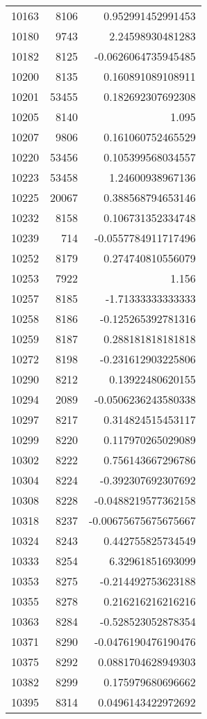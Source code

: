 \begin{tabular}{r | r | r}
10163 & 8106 & 0.952991452991453 \\
10180 & 9743 & 2.24598930481283 \\
10182 & 8125 & -0.0626064735945485 \\
10200 & 8135 & 0.160891089108911 \\
10201 & 53455 & 0.182692307692308 \\
10205 & 8140 & 1.095 \\
10207 & 9806 & 0.161060752465529 \\
10220 & 53456 & 0.105399568034557 \\
10223 & 53458 & 1.24600938967136 \\
10225 & 20067 & 0.388568794653146 \\
10232 & 8158 & 0.106731352334748 \\
10239 & 714 & -0.0557784911717496 \\
10252 & 8179 & 0.274740810556079 \\
10253 & 7922 & 1.156 \\
10257 & 8185 & -1.71333333333333 \\
10258 & 8186 & -0.125265392781316 \\
10259 & 8187 & 0.288181818181818 \\
10272 & 8198 & -0.231612903225806 \\
10290 & 8212 & 0.13922480620155 \\
10294 & 2089 & -0.0506236243580338 \\
10297 & 8217 & 0.314824515453117 \\
10299 & 8220 & 0.117970265029089 \\
10302 & 8222 & 0.756143667296786 \\
10304 & 8224 & -0.392307692307692 \\
10308 & 8228 & -0.0488219577362158 \\
10318 & 8237 & -0.00675675675675667 \\
10324 & 8243 & 0.442755825734549 \\
10333 & 8254 & 6.32961851693099 \\
10353 & 8275 & -0.214492753623188 \\
10355 & 8278 & 0.216216216216216 \\
10363 & 8284 & -0.528523052878354 \\
10371 & 8290 & -0.0476190476190476 \\
10375 & 8292 & 0.0881704628949303 \\
10382 & 8299 & 0.175979680696662 \\
10395 & 8314 & 0.0496143422972692 \\

\end{tabular}
